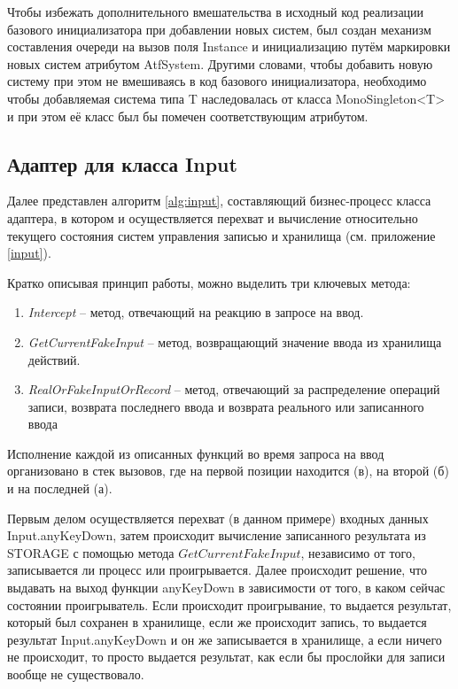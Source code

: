 Чтобы избежать дополнительного вмешательства в исходный код реализации базового инициализатора при добавлении новых систем, был создан механизм составления очереди на вызов поля Instance и инициализацию путём маркировки новых систем атрибутом AtfSystem. Другими словами, чтобы добавить новую систему при этом не вмешиваясь в код базового инициализатора, необходимо чтобы добавляемая система типа T наследовалась от класса MonoSingleton<T> и при этом её класс был бы помечен соответствующим атрибутом.

\subsection{Адаптер для класса Input}
Далее представлен алгоритм \ref{alg:input}, составляющий бизнес-процесс класса адаптера, в котором и осуществляется перехват и вычисление относительно текущего состояния систем управления записью и хранилища (см. приложение \ref{input}).

\newpage
Кратко описывая принцип работы, можно выделить три ключевых метода: 
\begin{enumerate}
	\item \textit{Intercept} -- метод, отвечающий на реакцию в запросе на ввод.
	\item \textit{GetCurrentFakeInput} -- метод, возвращающий значение ввода из хранилища действий.
	\item \textit{RealOrFakeInputOrRecord} -- метод, отвечающий за распределение операций записи, возврата последнего ввода и возврата реального или записанного ввода
\end{enumerate}

Исполнение каждой из описанных функций во время запроса на ввод организовано в стек вызовов, где на первой позиции находится (в), на второй (б) и на последней (а).

Первым делом осуществляется перехват (в данном примере) входных данных Input.anyKeyDown, затем происходит вычисление записанного результата из STORAGE с помощью метода $GetCurrentFakeInput$, независимо от того, записывается ли процесс или проигрывается. Далее происходит решение, что выдавать на выход функции anyKeyDown в зависимости от того, в каком сейчас состоянии проигрыватель. Если происходит проигрывание, то выдается результат, который был сохранен в хранилище, если же происходит запись, то выдается результат Input.anyKeyDown и он же записывается в хранилище, а если ничего не происходит, то просто выдается результат, как если бы прослойки для записи вообще не существовало.

